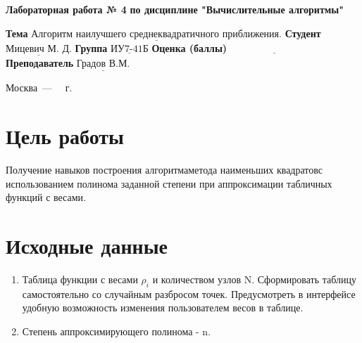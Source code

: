 \documentclass[a4paper,12pt]{article}
\begin{document}
\begin{center}
	\noindent\begin{minipage}{1.3\textwidth}\centering
	\Large\textbf{  Лабораторная работа № 4}\newline
	\textbf{по дисциплине "Вычислительные алгоритмы"}\newline\newline\newline
	\end{minipage}
\end{center}

\noindent\textbf{Тема} $\underline{\text{Алгоритм наилучшего среднеквадратичного приближения.}}$\newline\newline
\noindent\textbf{Студент} $\underline{\text{Мицевич М. Д.}}$\newline\newline
\noindent\textbf{Группа} $\underline{\text{ИУ7-41Б}}$\newline\newline
\noindent\textbf{Оценка (баллы)} $\underline{\text{~~~~~~~~~~~~~~~~~~~~~~~~~~~}}$\newline\newline
\noindent\textbf{Преподаватель} $\underline{\text{Градов В.М.}}$\newline

\begin{center}
	\vfill
	Москва~---~\the\year
~г.
\end{center}
\clearpage

\section{Цель работы}

\noindent Получение навыков построения алгоритмаметода наименьших квадратовс использованием  полинома заданной  степени  при  аппроксимации табличных функций  с весами.

\section{Исходные данные}
\begin{enumerate}
    \item Таблица  функции  с весами $\rho_{i}$ и количеством  узлов N. Сформировать  таблицу самостоятельно со случайным разбросом точек. Предусмотреть  в  интерфейсе  удобную  возможность  изменения пользователем  весов  в таблице.
    \item Степень аппроксимирующего полинома - n.
\end{enumerate}
\end{document}
